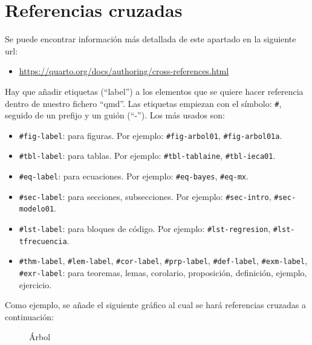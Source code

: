 \documentclass[
  11pt,
  a4paper,
  DIV=11,
  numbers=noendperiod]{scrartcl}
\providecommand{\tightlist}{%
  \setlength{\itemsep}{0pt}\setlength{\parskip}{0pt}}\usepackage{longtable,booktabs,array}
\theoremstyle{definition}
\theoremstyle{remark}
\begin{document}
\section{Referencias cruzadas}\label{referencias-cruzadas}

Se puede encontrar información más detallada de este apartado en la
siguiente url:

\begin{itemize}
\tightlist
\item
  \url{https://quarto.org/docs/authoring/cross-references.html}
\end{itemize}

Hay que añadir etiquetas (``label'') a los elementos que se quiere hacer
referencia dentro de nuestro fichero ``qmd''. Las etiquetas empiezan con
el símbolo: \texttt{\#}, seguido de un prefijo y un guión (``-''). Los
más usados son:

\begin{itemize}
\item
  \texttt{\#fig-label}: para figuras. Por ejemplo:
  \texttt{\#fig-arbol01}, \texttt{\#fig-arbol01a}.
\item
  \texttt{\#tbl-label}: para tablas. Por ejemplo:
  \texttt{\#tbl-tablaine}, \texttt{\#tbl-ieca01}.
\item
  \texttt{\#eq-label}: para ecuaciones. Por ejemplo:
  \texttt{\#eq-bayes}, \texttt{\#eq-mx}.
\item
  \texttt{\#sec-label}: para secciones, subsecciones. Por ejemplo:
  \texttt{\#sec-intro}, \texttt{\#sec-modelo01}.
\item
  \texttt{\#lst-label}: para bloques de código. Por ejemplo:
  \texttt{\#lst-regresion}, \texttt{\#lst-tfrecuencia}.
\item
  \texttt{\#thm-label}, \texttt{\#lem-label}, \texttt{\#cor-label},
  \texttt{\#prp-label}, \texttt{\#def-label}, \texttt{\#exm-label},
  \texttt{\#exr-label}: para teoremas, lemas, corolario, proposición,
  definición, ejemplo, ejercicio.
\end{itemize}

Como ejemplo, se añade el siguiente gráfico al cual se hará referencias
cruzadas a continuación:

\begin{figure}


\caption{\label{fig-arbol01}Árbol}

\end{figure}%
\end{document}
